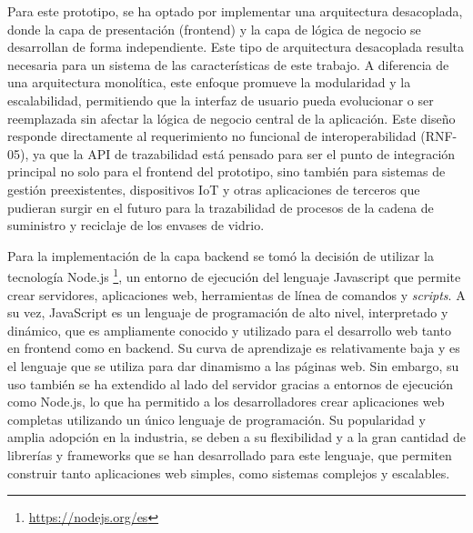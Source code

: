 Para este prototipo, se ha optado por implementar una arquitectura desacoplada, donde la capa de presentación (frontend) y la capa de lógica de negocio se desarrollan de forma independiente. Este tipo de arquitectura desacoplada resulta necesaria para un sistema de las características de este trabajo. A diferencia de una arquitectura monolítica, este enfoque promueve la modularidad y la escalabilidad, permitiendo que la interfaz de usuario pueda evolucionar o ser reemplazada sin afectar la lógica de negocio central de la aplicación. Este diseño responde directamente al requerimiento no funcional de interoperabilidad (RNF-05), ya que la API de trazabilidad está pensado para ser el punto de integración principal no solo para el frontend del prototipo, sino también para sistemas de gestión preexistentes, dispositivos IoT y otras aplicaciones de terceros que pudieran surgir en el futuro para la trazabilidad de procesos de la cadena de suministro y reciclaje de los envases de vidrio.

Para la implementación de la capa backend se tomó la decisión de utilizar la tecnología Node.js \footnote{\url{https://nodejs.org/es}}, un entorno de ejecución del lenguaje Javascript que permite crear servidores, aplicaciones web, herramientas de línea de comandos y \textit{scripts}. A su vez, JavaScript es un lenguaje de programación de alto nivel, interpretado y dinámico, que es ampliamente conocido y utilizado para el desarrollo web tanto en frontend como en backend. Su curva de aprendizaje es relativamente baja y es el lenguaje que se utiliza para dar dinamismo a las páginas web. Sin embargo, su uso también se ha extendido al lado del servidor gracias a entornos de ejecución como Node.js, lo que ha permitido a los desarrolladores crear aplicaciones web completas utilizando un único lenguaje de programación. Su popularidad y amplia adopción en la industria, se deben a su flexibilidad y a la gran cantidad de librerías y frameworks que se han desarrollado para este lenguaje, que permiten construir tanto aplicaciones web simples, como sistemas complejos y escalables.

